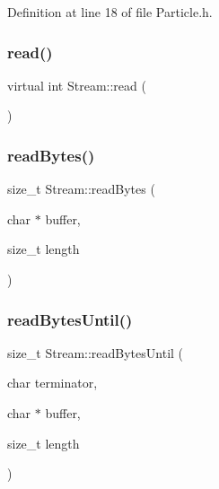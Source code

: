 Definition at line 18 of file Particle.\+h.

\mbox{\label{class_stream_aea5dee9fcb038148515b7c9212d38dc0}} 
\subsubsection{\texorpdfstring{read()}{read()}\hspace{0.1cm}{\footnotesize\ttfamily [2/2]}}
{\footnotesize\ttfamily virtual int Stream\+::read (\begin{DoxyParamCaption}{ }\end{DoxyParamCaption})\hspace{0.3cm}{\ttfamily [pure virtual]}}

\mbox{\label{class_stream_a45fd1336a323ea83b16e8507055f44ea}} 
\subsubsection{\texorpdfstring{read\+Bytes()}{readBytes()}}
{\footnotesize\ttfamily size\+\_\+t Stream\+::read\+Bytes (\begin{DoxyParamCaption}\item[{char $\ast$}]{buffer,  }\item[{size\+\_\+t}]{length }\end{DoxyParamCaption})}

\mbox{\label{class_stream_af84672a4fb2620466958d3118d4fea00}} 
\subsubsection{\texorpdfstring{read\+Bytes\+Until()}{readBytesUntil()}}
{\footnotesize\ttfamily size\+\_\+t Stream\+::read\+Bytes\+Until (\begin{DoxyParamCaption}\item[{char}]{terminator,  }\item[{char $\ast$}]{buffer,  }\item[{size\+\_\+t}]{length }\end{DoxyParamCaption})}

